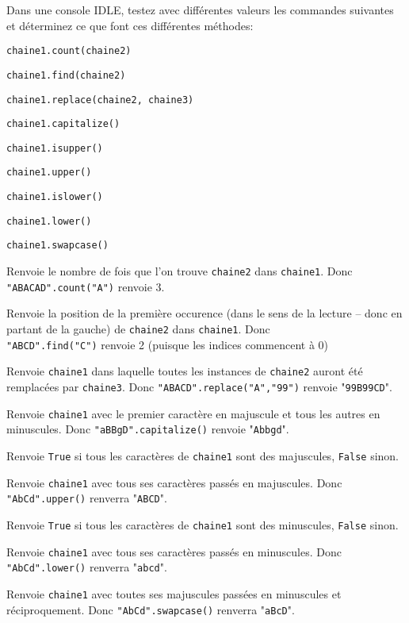 \documentclass[12pt]{article}
\begin{document}
	\begin{MonExo}
		Dans une console IDLE, testez avec différentes valeurs les commandes suivantes et déterminez ce que font ces différentes méthodes:
		\begin{alphenum}
			\item \texttt{chaine1.count(chaine2)}
			\item \texttt{chaine1.find(chaine2)}
			\item \texttt{chaine1.replace(chaine2, chaine3)}
			\item \texttt{chaine1.capitalize()}
			\item \texttt{chaine1.isupper()}
			\item \texttt{chaine1.upper()}
			\item \texttt{chaine1.islower()}
			\item \texttt{chaine1.lower()}
			\item \texttt{chaine1.swapcase()}
		\end{alphenum}
	\end{MonExo}
	\begin{MaReponse}
		\begin{alphenum}
			\item Renvoie le nombre de fois que l'on trouve \texttt{chaine2} dans \texttt{chaine1}. Donc \texttt{"ABACAD".count("A")} renvoie 3.
			\item Renvoie la position de la première occurence (dans le sens de la lecture -- donc en partant de la gauche) de \texttt{chaine2} dans \texttt{chaine1}. Donc\\ \texttt{"ABCD".find("C")} renvoie 2 (puisque les indices commencent à 0)
			\item Renvoie \texttt{chaine1} dans laquelle toutes les instances de \texttt{chaine2} auront été remplacées par \texttt{chaine3}. Donc \texttt{"ABACD".replace("A","99")} renvoie "\texttt{99B99CD}".
			\item Renvoie \texttt{chaine1} avec le premier caractère en majuscule et tous les autres en minuscules. Donc \texttt{"aBBgD".capitalize()} renvoie "\texttt{Abbgd}".
			\item Renvoie \texttt{True} si tous les caractères de \texttt{chaine1} sont des majuscules, \texttt{False} sinon.
			\item Renvoie \texttt{chaine1} avec tous ses caractères passés en majuscules. Donc \texttt{"AbCd".upper()} renverra "\texttt{ABCD}".
			\item Renvoie \texttt{True} si tous les caractères de \texttt{chaine1} sont des minuscules, \texttt{False} sinon.
			\item Renvoie \texttt{chaine1} avec tous ses caractères passés en minuscules. Donc \texttt{"AbCd".lower()} renverra "\texttt{abcd}".
			\item Renvoie \texttt{chaine1} avec toutes ses majuscules passées en minuscules et réciproquement. Donc \texttt{"AbCd".swapcase()} renverra "\texttt{aBcD}".
		\end{alphenum}
	\end{MaReponse}
	
\end{document}
